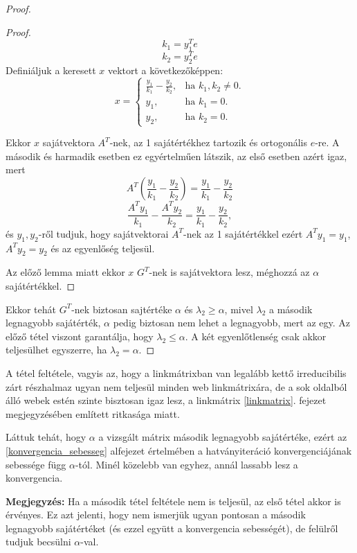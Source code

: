 \documentclass[12pt,a4paper]{article}
\begin{document}
\begin{proof}
\begin{proof}
		\[ k_1 = y_1^T e \]
		\[ k_2 = y_2^T e \]
		Definiáljuk a keresett $x$ vektort a következőképpen:
		\begin{equation*}
		x=\begin{cases}
		\frac{y_1}{k_1} - \frac{y_2}{k_2}, & \text{ha $k_1,k_2 \neq 0$}.\\
		y_1, & \text{ha $k_1 = 0$}. \\
		y_2, & \text{ha $k_2 = 0$}. 
		\end{cases}
		\end{equation*}
		
		Ekkor $x$ sajátvektora $A^T$-nek, az 1 sajátértékhez tartozik és ortogonális $e$-re. A második és harmadik esetben ez egyértelműen látszik, az első esetben azért igaz, mert 
		\[ A^T (\frac{y_1}{k_1} - \frac{y_2}{k_2}) = \frac{y_1}{k_1} - \frac{y_2}{k_2} \] 
		\[ \frac{A^T y_1}{k_1} - \frac{A^T y_2}{k_2} = \frac{y_1}{k_1} - \frac{y_2}{k_2}, \]
		és $y_1,y_2$-ről tudjuk, hogy sajátvektorai $A^T$-nek az 1 sajátértékkel ezért $A^T y_1 = y_1$, $A^T y_2 = y_2$ és az egyenlőség teljesül. 
		
		Az előző lemma miatt ekkor $x$ $G^T$-nek is sajátvektora lesz, méghozzá az $\alpha$ sajátértékkel.  
		\phantom\qedhere
	\end{proof} 

	Ekkor tehát $G^T$-nek biztosan sajtértéke $\alpha$ és $\lambda_2 \geq \alpha$, mivel $\lambda_2$ a második legnagyobb sajátérték, $\alpha$ pedig biztosan nem lehet a legnagyobb, mert az egy. Az előző tétel viszont garantálja, hogy $\lambda_2 \leq \alpha$. A két egyenlőtlenség csak akkor teljesülhet egyszerre, ha $\lambda_2 = \alpha$.
\end{proof}
\vspace{0.2cm}

A tétel feltétele, vagyis az, hogy a linkmátrixban van legalább kettő irreducibilis zárt részhalmaz ugyan nem teljesül minden web linkmátrixára, de a sok oldalból álló webek estén szinte bisztosan igaz lesz, a linkmátrix \ref{linkmatrix}. fejezet megjegyzésében említett ritkasága miatt.

Láttuk tehát, hogy $\alpha$ a vizsgált mátrix második legnagyobb sajátértéke, ezért az \ref{konvergencia_sebesseg} alfejezet értelmében a hatványiteráció konvergenciájának sebessége függ $\alpha$-tól. Minél közelebb van egyhez, annál lassabb lesz a konvergencia.

\vspace{0.2cm}\textbf{Megjegyzés:} Ha a második tétel feltétele nem is teljesül, az első tétel akkor is érvényes. Ez azt jelenti, hogy nem ismerjük ugyan pontosan a második legnagyobb sajátértéket (és ezzel együtt a konvergencia sebességét), de felülről tudjuk becsülni $\alpha$-val.
\end{document}
